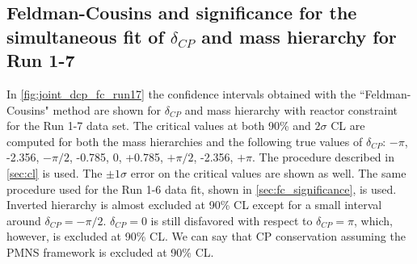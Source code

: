 %
%

\subsection {Feldman-Cousins and significance for the simultaneous fit of $\delta_{CP}$ and mass hierarchy for Run 1-7}
\label{sec:fc_significance_run17}


In \cref{fig:joint_dcp_fc_run17} the confidence intervals obtained with the ``Feldman-Cousins" method
are shown for $\delta_{CP}$ and mass hierarchy with reactor constraint for the Run 1-7 data set.
The critical values at both 90\% and $2\sigma$ CL are computed
for both the mass hierarchies and the following true values of $\delta_{CP}$: 
$-\pi$, -2.356, $-\pi/2$, -0.785, 0, +0.785, $+\pi/2$, -2.356, $+\pi$. 
The procedure described in \cref{sec:cl} is used.
The $\pm 1 \sigma$ error on the critical values are shown as well.
The same procedure used for the Run 1-6 data fit, shown in \cref{sec:fc_significance}, is used.
Inverted hierarchy is almost excluded at 90\% CL except for a small interval around $\delta_{CP} = -\pi / 2$.
$\delta_{CP} = 0$ is still disfavored with respect to $\delta_{CP} = \pi$, which, however, is excluded at 90\% CL. 
We can say that CP conservation assuming the PMNS framework is excluded at 90\% CL. 

